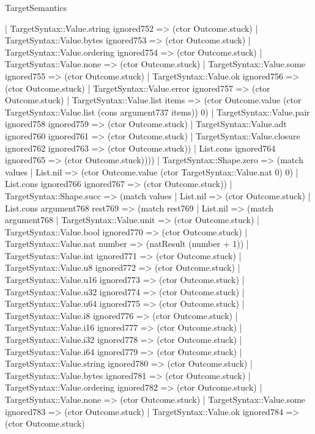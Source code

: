 \begin{lexlean}{TargetSemantics}
\begin{semanticmodule}
{            | TargetSyntax::Value.string ignored752 => (ctor Outcome.stuck)
            | TargetSyntax::Value.bytes ignored753 => (ctor Outcome.stuck)
            | TargetSyntax::Value.ordering ignored754 => (ctor Outcome.stuck)
            | TargetSyntax::Value.none => (ctor Outcome.stuck)
            | TargetSyntax::Value.some ignored755 => (ctor Outcome.stuck)
            | TargetSyntax::Value.ok ignored756 => (ctor Outcome.stuck)
            | TargetSyntax::Value.error ignored757 => (ctor Outcome.stuck)
            | TargetSyntax::Value.list items => (ctor Outcome.value (ctor TargetSyntax::Value.list (cons argument737 items)) 0)
            | TargetSyntax::Value.pair ignored758 ignored759 => (ctor Outcome.stuck)
            | TargetSyntax::Value.adt ignored760 ignored761 => (ctor Outcome.stuck)
            | TargetSyntax::Value.closure ignored762 ignored763 => (ctor Outcome.stuck))
          | List.cons ignored764 ignored765 => (ctor Outcome.stuck))))
    | TargetSyntax::Shape.zero => (match values
      | List.nil => (ctor Outcome.value (ctor TargetSyntax::Value.nat 0) 0)
      | List.cons ignored766 ignored767 => (ctor Outcome.stuck))
    | TargetSyntax::Shape.succ => (match values
      | List.nil => (ctor Outcome.stuck)
      | List.cons argument768 rest769 => (match rest769
        | List.nil => (match argument768
          | TargetSyntax::Value.unit => (ctor Outcome.stuck)
          | TargetSyntax::Value.bool ignored770 => (ctor Outcome.stuck)
          | TargetSyntax::Value.nat number => (natResult (number + 1))
          | TargetSyntax::Value.int ignored771 => (ctor Outcome.stuck)
          | TargetSyntax::Value.u8 ignored772 => (ctor Outcome.stuck)
          | TargetSyntax::Value.u16 ignored773 => (ctor Outcome.stuck)
          | TargetSyntax::Value.u32 ignored774 => (ctor Outcome.stuck)
          | TargetSyntax::Value.u64 ignored775 => (ctor Outcome.stuck)
          | TargetSyntax::Value.i8 ignored776 => (ctor Outcome.stuck)
          | TargetSyntax::Value.i16 ignored777 => (ctor Outcome.stuck)
          | TargetSyntax::Value.i32 ignored778 => (ctor Outcome.stuck)
          | TargetSyntax::Value.i64 ignored779 => (ctor Outcome.stuck)
          | TargetSyntax::Value.string ignored780 => (ctor Outcome.stuck)
          | TargetSyntax::Value.bytes ignored781 => (ctor Outcome.stuck)
          | TargetSyntax::Value.ordering ignored782 => (ctor Outcome.stuck)
          | TargetSyntax::Value.none => (ctor Outcome.stuck)
          | TargetSyntax::Value.some ignored783 => (ctor Outcome.stuck)
          | TargetSyntax::Value.ok ignored784 => (ctor Outcome.stuck)
}
\end{semanticmodule}
\end{lexlean}
